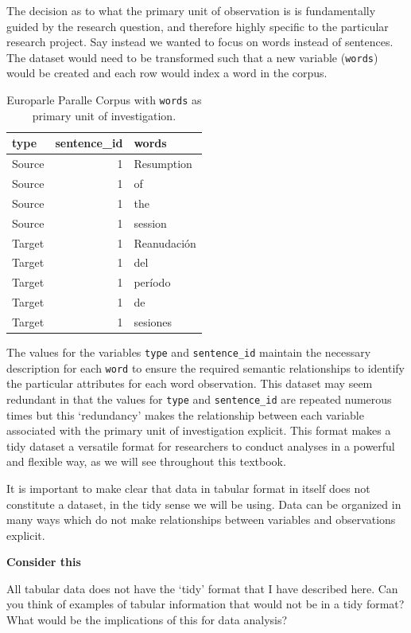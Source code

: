 \documentclass[
  letterpaper,
]{latex/krantz}
\begin{document}
The decision as to what the primary unit of observation is is
fundamentally guided by the research question, and therefore highly
specific to the particular research project. Say instead we wanted to
focus on words instead of sentences. The dataset would need to be
transformed such that a new variable (\texttt{words}) would be created
and each row would index a word in the corpus.

\hypertarget{tbl-tidy-words-europarle}{}
\begin{table}
\caption{\label{tbl-tidy-words-europarle}Europarle Paralle Corpus with \texttt{words} as primary unit of
investigation. }\tabularnewline

\centering
\begin{tabular}{lrl}
\toprule
type & sentence\_id & words\\
\midrule
Source & 1 & Resumption\\
Source & 1 & of\\
Source & 1 & the\\
Source & 1 & session\\
Target & 1 & Reanudación\\
\addlinespace
Target & 1 & del\\
Target & 1 & período\\
Target & 1 & de\\
Target & 1 & sesiones\\
\bottomrule
\end{tabular}
\end{table}

The values for the variables \texttt{type} and \texttt{sentence\_id}
maintain the necessary description for each \texttt{word} to ensure the
required semantic relationships to identify the particular attributes
for each word observation. This dataset may seem redundant in that the
values for \texttt{type} and \texttt{sentence\_id} are repeated numerous
times but this `redundancy' makes the relationship between each variable
associated with the primary unit of investigation explicit. This format
makes a tidy dataset a versatile format for researchers to conduct
analyses in a powerful and flexible way, as we will see throughout this
textbook.

It is important to make clear that data in tabular format in itself does
not constitute a dataset, in the tidy sense we will be using. Data can
be organized in many ways which do not make relationships between
variables and observations explicit.

\begin{tcolorbox}[enhanced jigsaw, arc=.35mm, leftrule=.75mm, rightrule=.15mm, opacityback=0, colback=white, breakable, bottomrule=.15mm, left=2mm, toprule=.15mm]

\textbf{ Consider this}

All tabular data does not have the `tidy' format that I have described
here. Can you think of examples of tabular information that would not be
in a tidy format? What would be the implications of this for data
analysis?

\end{tcolorbox}
\end{document}
